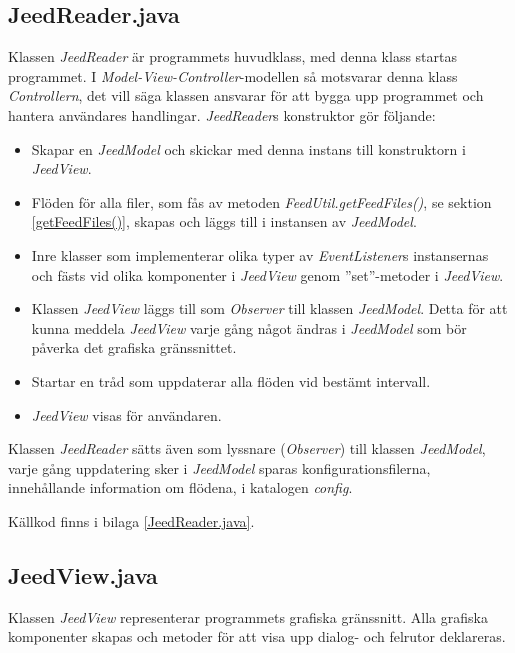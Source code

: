 \documentclass[titlepage, twoside, a4paper, 12pt]{article}
\begin{document}
\subsection{JeedReader.java}\label{JeedReader}
Klassen \textit{JeedReader} är programmets huvudklass, med denna klass
startas programmet. I \textit{Model-View-Controller}-modellen så
motsvarar denna klass \textit{Controllern}, det vill säga klassen
ansvarar för att bygga upp programmet och hantera användares
handlingar. \textit{JeedReader}s konstruktor gör följande:

\begin{itemize}
\item Skapar en \textit{JeedModel} och skickar med denna instans till
  konstruktorn i \textit{JeedView}.

\item Flöden för alla filer, som fås av metoden
  \textit{FeedUtil.getFeedFiles()}, se sektion \ref{getFeedFiles()},
  skapas och läggs till i instansen av \textit{JeedModel}.

\item Inre klasser som implementerar olika typer av
  \textit{EventListener}s instansernas och fästs vid olika komponenter
  i \textit{JeedView} genom ''set''-metoder i \textit{JeedView}.

\item Klassen \textit{JeedView} läggs till som \textit{Observer} till
  klassen \textit{JeedModel}. Detta för att kunna meddela
  \textit{JeedView} varje gång något ändras i \textit{JeedModel} som
  bör påverka det grafiska gränssnittet.

\item Startar en tråd som uppdaterar alla flöden vid bestämt
  intervall.
  
\item \textit{JeedView} visas för användaren.
\end{itemize}

Klassen \textit{JeedReader} sätts även som lyssnare
(\textit{Observer}) till klassen \textit{JeedModel}, varje gång
uppdatering sker i \textit{JeedModel} sparas konfigurationsfilerna,
innehållande information om flödena, i katalogen \textit{config}.

Källkod finns i bilaga \ref{JeedReader.java}.

\subsection{JeedView.java}\label{JeedView}
Klassen \textit{JeedView} representerar programmets grafiska
gränssnitt. Alla grafiska komponenter skapas och metoder för att visa
upp dialog- och felrutor deklareras.
\end{document}

